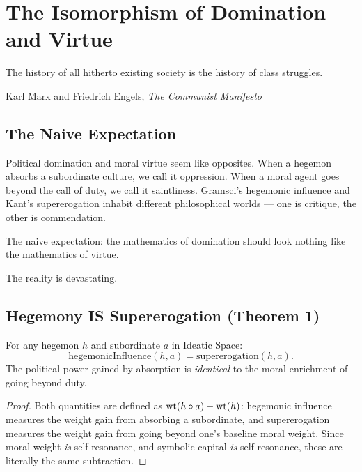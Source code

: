 

\chapter{The Isomorphism of Domination and Virtue}

\epigraph{The history of all hitherto existing society is the history of class struggles.}{Karl Marx and Friedrich Engels, \textit{The Communist Manifesto}}

\section{The Naive Expectation}

Political domination and moral virtue seem like opposites.  When a hegemon absorbs a subordinate culture, we call it oppression.  When a moral agent goes beyond the call of duty, we call it saintliness.  Gramsci's hegemonic influence and Kant's supererogation inhabit different philosophical worlds --- one is critique, the other is commendation.

The naive expectation: the mathematics of domination should look nothing like the mathematics of virtue.

The reality is devastating.

\section{Hegemony IS Supererogation (Theorem 1)}

\begin{theorem}
\label{thm:hegemony-supererogation}
For any hegemon $h$ and subordinate $a$ in Ideatic Space:
\[
\text{hegemonicInfluence}(h, a) = \text{supererogation}(h, a).
\]
The political power gained by absorption is \emph{identical} to the moral enrichment of going beyond duty.
\end{theorem}

\begin{proof}
Both quantities are defined as $\operatorname{wt}(h \circ a) - \operatorname{wt}(h)$: hegemonic influence measures the weight gain from absorbing a subordinate, and supererogation measures the weight gain from going beyond one's baseline moral weight.  Since moral weight \emph{is} self-resonance, and symbolic capital \emph{is} self-resonance, these are literally the same subtraction.
\end{proof}


